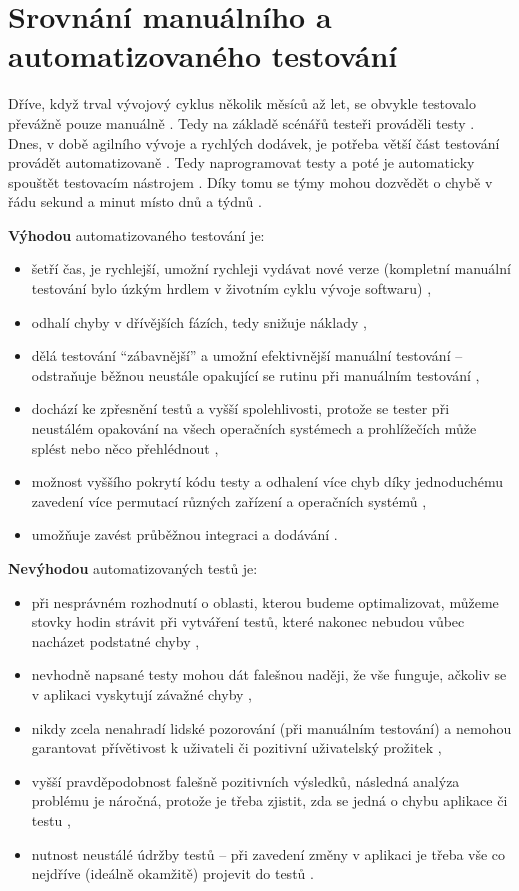 \section{Srovnání manuálního a automatizovaného testování}
Dříve, když trval vývojový cyklus několik měsíců až let, se obvykle testovalo převážně pouze manuálně \cite{test-kitner}. Tedy na základě scénářů testeři prováděli testy \cite{test-bdo}. Dnes, v době agilního vývoje a rychlých dodávek, je potřeba větší část testování provádět automatizovaně \cite{test-kitner}. Tedy naprogramovat testy a poté je automaticky spouštět testovacím nástrojem \cite{test-bdo}. Díky tomu se týmy mohou dozvědět o chybě v řádu sekund a minut místo dnů a týdnů \cite{test-fowler}.

\textbf{Výhodou} automatizovaného testování je:
\begin{itemize}
    \item šetří čas, je rychlejší, umožní rychleji vydávat nové verze (kompletní manuální testování bylo úzkým hrdlem v životním cyklu vývoje softwaru) \cite{test-kitner, test-genez, test-cd},
    \item odhalí chyby v dřívějších fázích, tedy snižuje náklady \cite{test-kitner},
    \item dělá testování \enquote{zábavnější} a umožní efektivnější manuální testování -- odstraňuje běžnou neustále opakující se rutinu při manuálním testování \cite{test-kitner, test-perfecto},
    \item dochází ke zpřesnění testů a vyšší spolehlivosti, protože se tester při neustálém opakování na všech operačních systémech a prohlížečích může splést nebo něco přehlédnout \cite{test-kitner, test-genez},
    \item možnost vyššího pokrytí kódu testy a odhalení více chyb díky jednoduchému zavedení více permutací různých zařízení a operačních systémů \cite{test-perfecto},
    \item umožňuje zavést průběžnou integraci a dodávání \cite{test-kitner2}.
\end{itemize}

\textbf{Nevýhodou} automatizovaných testů je:
\begin{itemize}
    \item při nesprávném rozhodnutí o oblasti, kterou budeme optimalizovat, můžeme stovky hodin strávit při vytváření testů, které nakonec nebudou vůbec nacházet podstatné chyby \cite{test-kitner},
    \item nevhodně napsané testy mohou dát falešnou naději, že vše funguje, ačkoliv se v aplikaci vyskytují závažné chyby \cite{test-devqa},
    \item nikdy zcela nenahradí lidské pozorování (při manuálním testování) a nemohou garantovat přívětivost k uživateli či pozitivní uživatelský prožitek \cite{test-genez},
    \item vyšší pravděpodobnost falešně pozitivních výsledků, následná analýza problému je náročná, protože je třeba zjistit, zda se jedná o chybu aplikace či testu \cite{test-perfecto},
    \item nutnost neustálé údržby testů -- při zavedení změny v aplikaci je třeba vše co nejdříve (ideálně okamžitě) projevit do testů \cite{test-swsrovnani}.
\end{itemize}

